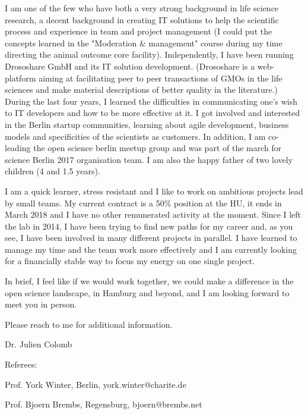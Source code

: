 I am one of the few who have both a very strong background in life science research, a decent background in creating IT solutions to help the scientific process and experience in team and project management (I could put the concepts learned in the "Moderation \& management" course during my time directing the animal outcome core facility). 
Independently, I have been running Drososhare GmbH and its IT solution development. (Drososhare is a web-platform aiming at facilitating peer to peer transactions of GMOs in the life sciences and make material descriptions of better quality in the literature.) During the last four years, I learned the difficulties in communicating one's wish to IT developers and how to be more effective at it. I got involved and interested in the Berlin startup communities, learning about agile development, business models and specificities of the scientists as customers. In addition, I am co-leading the open science berlin meetup group and was part of the march for science Berlin 2017 organisation team. I am also the happy father of two lovely children (4 and 1.5 years).

\newpage 

I am  a quick learner, stress resistant and I like to work on ambitious projects lead by small teams. My current contract is a 50\% position at the HU, it ends in March 2018 and I have no other remunerated activity at the moment. 
Since I left the lab in 2014, I have been trying to find new paths for my career and,
as you see, I have been involved in many different projects in parallel. I have learned to manage my time and the team work more effectively and I am currently looking for a financially stable way to focus my energy on one single project. 

In brief, I feel like if we would work together, we could make a difference in the open science landscape, in Hamburg and beyond,
and I am looking forward to meet you in person.

Please reach to me for additional information.

Dr. Julien Colomb


\vspace {1.5cm} 

Referees:

Prof. York Winter, Berlin, york.winter@charite.de
 
 
Prof. Bjoern Brembs, Regensburg, bjoern@brembs.net
